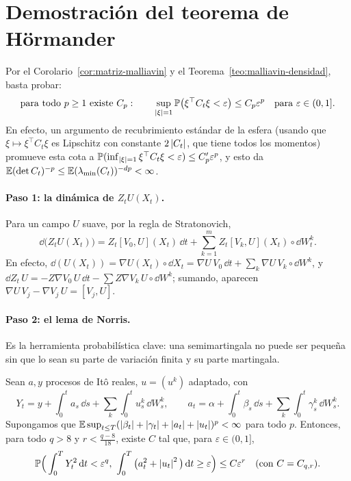 \section{Demostración del teorema de Hörmander}
Por el Corolario~\ref{cor:matriz-malliavin} y el Teorema~\ref{teo:malliavin-densidad}, basta probar:
\begin{equation}\label{eq:hormander-objetivo}
  \text{para todo }p\ge1\text{ existe }C_p:\qquad\sup_{\left\lvert \xi\right\rvert=1}\mathbb{P}\big(\xi^\top C_t\xi<\varepsilon\big)\le C_p\varepsilon^p\quad\text{para }\varepsilon\in(0,1].
\end{equation}
En efecto, un argumento de recubrimiento estándar de la esfera (usando que $\xi\mapsto\xi^\top C_t\xi$ es Lipschitz
con constante $2\left\lvert C_t\right\rvert$, que tiene todos los momentos) promueve esta cota a $\mathbb{P}(\inf_{\left\lvert \xi\right\rvert=1}\xi^\top C_t\xi<
\varepsilon)\le C_p'\varepsilon^p$, y esto da $\mathbb{E}(\det C_t)^{-p}\le\mathbb{E}(\lambda_{\min}(C_t))^{-dp}<\infty$.

\paragraph{Paso 1: la dinámica de $Z_tU(X_t)$.} Para un campo $U$ suave, por la regla de Stratonovich,
\begin{equation}\label{eq:dinamica-ZU}
  \dd\big(Z_tU(X_t)\big)=Z_t[V_0,U](X_t)\,\dd t+\sum_{k=1}^mZ_t[V_k,U](X_t)\circ\dd W^k_t.
\end{equation}
En efecto, $\dd(U(X_t))=\nabla U(X_t)\circ\dd X_t=\nabla U\,V_0\,\dd t+\sum_k\nabla U\,V_k\circ\dd W^k$, y $\dd Z_t\,U=-Z\nabla V_0\,U\,\dd t-
\sum Z\nabla V_k\,U\circ\dd W^k$; sumando, aparecen $\nabla U\,V_j-\nabla V_j\,U=[V_j,U]$.

\paragraph{Paso 2: el lema de Norris.} Es la herramienta probabilística clave: una semimartingala no
puede ser pequeña sin que lo sean su parte de variación finita y su parte martingala.

\begin{lema}[Norris]\label{lem:norris}
Sean $a,y$ procesos de Itô reales, $u=(u^k)$ adaptado, con
\[
  Y_t=y+\int_0^ta_s\,\dd s+\sum_k\int_0^tu^k_s\,\dd W^k_s,\qquad a_t=\alpha+\int_0^t\beta_s\,\dd s+\sum_k\int_0^t\gamma^k_s\,\dd W^k_s.
\]
Supongamos que $\mathbb{E}\sup_{t\le T}(\left\lvert \beta_t\right\rvert+\left\lvert \gamma_t\right\rvert+\left\lvert a_t\right\rvert+\left\lvert u_t\right\rvert)^p<\infty$ para todo $p$. Entonces, para todo $q>8$
y $r<\frac{q-8}{18}$, existe $C$ tal que, para $\varepsilon\in(0,1]$,
\[
  \mathbb{P}\Big(\int_0^TY_t^2\,\mathrm{d} t<\varepsilon^q,\ \int_0^T\big(a_t^2+\left\lvert u_t\right\rvert^2\big)\,\mathrm{d} t\ge\varepsilon\Big)\le C\varepsilon^r\quad\text{(con }C=C_{q,r}).
\]
\end{lema}

